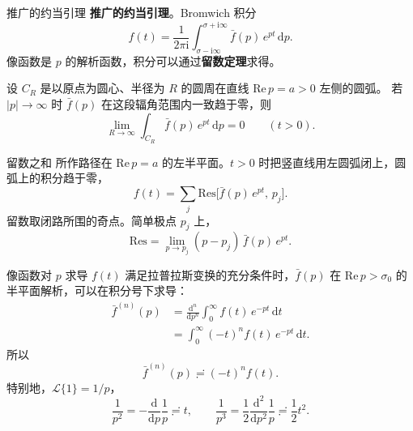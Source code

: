 \documentclass[fontset=windows, chinese, 10pt, xcolor=dvipsnames]{beamer}
\begin{document}
\begin{frame}{推广的约当引理}
  \textbf{推广的约当引理}。Bromwich 积分
  \begin{equation*}
    f(t)=\frac{1}{2\pi\mathrm{i}}
      \int_{\sigma-\mathrm{i}\infty}^{\sigma+\mathrm{i}\infty}
      \bar f(p)\,e^{pt}\,\mathrm{d}p.
  \end{equation*}
  像函数是 $p$ 的解析函数，积分可以通过\textbf{留数定理}求得。
  \vspace{0.3em}

  设 $C_R$ 是以原点为圆心、半径为 $R$ 的圆周在直线 $\mathrm{Re}\,p=a>0$ 左侧的圆弧。
  若 $|p|\to\infty$ 时 $\bar f(p)$ 在这段辐角范围内一致趋于零，则
  \begin{equation*}
    \lim_{R\to\infty}\int_{C_R}\bar f(p)\,e^{pt}\,\mathrm{d}p=0
    \qquad(t>0).
  \end{equation*}
\end{frame}

\begin{frame}{留数之和}
  所作路径在 $\mathrm{Re}\,p=a$ 的左半平面。$t>0$ 时把竖直线用左圆弧闭上，圆弧上的积分趋于零，
  \begin{equation*}
    f(t)=\sum_j\mathrm{Res}\bigl[\bar f(p)\,e^{pt},\,p_j\bigr].
  \end{equation*}
  留数取闭路所围的奇点。简单极点 $p_j$ 上，
  \begin{equation*}
    \mathrm{Res}
    =\lim_{p\to p_j}(p-p_j)\,\bar f(p)\,e^{pt}.
  \end{equation*}
\end{frame}

\begin{frame}{像函数对 $p$ 求导}
  $f(t)$ 满足拉普拉斯变换的充分条件时，$\bar f(p)$ 在 $\mathrm{Re}\,p>\sigma_0$ 的半平面解析，可以在积分号下求导：
  \begin{align*}
    \bar f^{(n)}(p)
    &=\frac{\mathrm{d}^n}{\mathrm{d}p^n}
      \int_0^{\infty} f(t)\,e^{-pt}\,\mathrm{d}t \\
    &=\int_0^{\infty}(-t)^n f(t)\,e^{-pt}\,\mathrm{d}t.
  \end{align*}
  所以
  \begin{equation*}
    \bar f^{(n)}(p)\risingdotseq (-t)^n f(t).
  \end{equation*}
  特别地，$\mathcal{L}\{1\}=1/p$，
  \begin{equation*}
    \frac{1}{p^2}=-\frac{\mathrm{d}}{\mathrm{d}p}\frac{1}{p}\risingdotseq t,
    \qquad
    \frac{1}{p^3}=\frac12\frac{\mathrm{d}^2}{\mathrm{d}p^2}\frac{1}{p}
      \risingdotseq\frac12 t^2.
  \end{equation*}
\end{frame}
\end{document}
